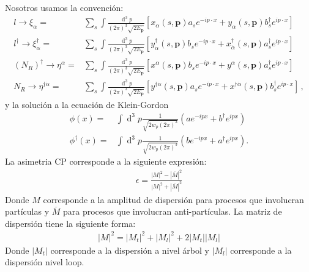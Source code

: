Nosotros usamos la convención:
\begin{align}
 l\to \xi_{\alpha}=&\sum_s\int \frac{\operatorname{d}^3p}{(2\pi)^3\sqrt{2E_{\mathbf{p}}}} \left[ x_{\alpha}\left(s,\mathbf{p}\right) a_s e^{-i p\cdot x}+y_{\alpha}\left(s,\mathbf{p}\right) b_s^{\dagger} e^{i p\cdot x}  \right]\nonumber\\
  l ^{\dagger}\to \xi_{\dot{\alpha}}^{\dagger}=&\sum_s\int \frac{\operatorname{d}^3p}{(2\pi)^3\sqrt{2E_{\mathbf{p}}}} \left[ y_{\dot{\alpha}}^{\dagger}\left(s,\mathbf{p}\right) b_s e^{-i p\cdot x}+x_{\dot{\alpha}}^{\dagger}\left(s,\mathbf{p}\right) a_s^{\dagger} e^{i p\cdot x}  \right]\nonumber\\
 \left( N_R \right)^{\dagger}\to \eta^{\alpha}=&\sum_s\int \frac{\operatorname{d}^3p}{(2\pi)^3\sqrt{2E_{\mathbf{p}}}} \left[ x^{\alpha}\left(s,\mathbf{p}\right) b_s e^{-i p\cdot x}+y^{\alpha}\left(s,\mathbf{p}\right) a_s^{\dagger} e^{i p\cdot x}  \right] \nonumber\\
  N_R\to \eta^{\dagger\dot{\alpha}}=&\sum_s\int \frac{\operatorname{d}^3p}{(2\pi)^3\sqrt{2E_{\mathbf{p}}}} \left[ y^{\dagger\dot{\alpha}}\left(s,\mathbf{p}\right) a_s e^{-i p\cdot x}+x^{\dagger\dot{\alpha}}\left(s,\mathbf{p}\right) b_s^{\dagger} e^{i p\cdot x}  \right]\, ,
\end{align}
y la solución a la ecuación de Klein-Gordon 
\begin{align}
\phi(x)=&\int\operatorname{d}^3p\frac{1}{\sqrt{2w_{p}(2\pi)^{3}}}(ae^{-ipx}+b^{\dagger}e^{ipx}) \nonumber\\
\phi^\dagger(x)=&\int\operatorname{d}^3p\frac{1}{\sqrt{2w_{p}(2\pi)^{3}}}(be^{-ipx}+a^{\dagger}e^{ipx}).
\end{align}
La asimetria CP corresponde a la siguiente expresión:
\begin{align}
\label{asimetria}
\epsilon=\frac{|M|^2-|\overline{M}|^2}{|M|^2+|\overline{M}|^2}
\end{align}
Donde $M$ corresponde a la amplitud de dispersión para procesos que involucran partículas y $\overline{M}$ para procesos que involucran anti-partículas. La matriz de dispersión tiene la siguiente forma:
\begin{align}
|M|^2=|M_{t}|^2+|M_{l}|^2+2|M_{t}||M_{l}|
\end{align}
Donde $|M_{t}|$ corresponde a la dispersión a nivel árbol y $|M_{l}|$ corresponde a la dispersión nivel loop.

